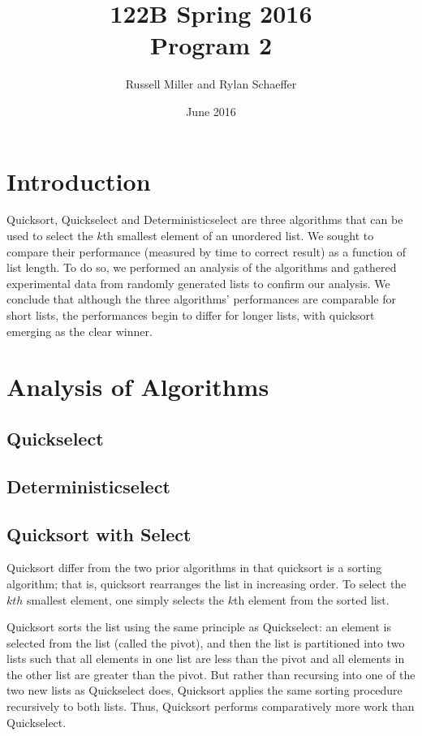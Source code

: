 \documentclass{article}
\title{122B Spring 2016 \\ Program 2}
\author{Russell Miller and Rylan Schaeffer }
\date{June 2016}
\begin{document}
\maketitle

\section*{Introduction}
\indent \indent Quicksort, Quickselect and Deterministicselect are three algorithms that can be used to select the $k$th smallest element of an unordered list. We sought to compare their performance (measured by time to correct result) as a function of list length. To do so, we performed an analysis of the algorithms and gathered experimental data from randomly generated lists to confirm our analysis. We conclude that although the three algorithms' performances are comparable for short lists, the performances begin to differ for longer lists, with quicksort emerging as the clear winner.

\section*{Analysis of Algorithms}
\subsection*{Quickselect}
\indent \indent 

\subsection*{Deterministicselect}
\indent \indent 

\subsection*{Quicksort with Select}
\indent \indent Quicksort differ from the two prior algorithms in that quicksort is a sorting algorithm; that is, quicksort rearranges the list in increasing order. To select the $kth$ smallest element, one simply selects the $k$th element from the sorted list.

Quicksort sorts the list using the same principle as Quickselect: an element is selected from the list (called the pivot), and then the list is partitioned into two lists such that all elements in one list are less than the pivot and all elements in the other list are greater than the pivot. But rather than recursing into one of the two new lists as Quickselect does, Quicksort applies the same sorting procedure recursively to both lists. Thus, Quicksort performs comparatively more work than Quickselect.
\end{document}
